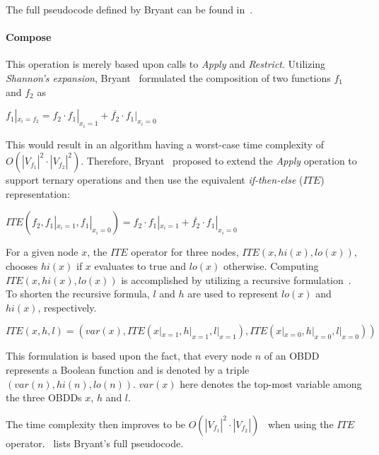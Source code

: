 \documentclass{vldb}
\begin{document}
The full pseudocode defined by Bryant can be found in~\cite[p. 685]{BRYANT86}.

\paragraph*{Compose}
\mbox{} %

This operation is merely based upon calls to \textit{Apply} and \textit{Restrict}.
Utilizing \textit{Shannon's expansion}, Bryant~\cite{BRYANT86} formulated the
composition of two functions $f_1$ and $f_2$ as
\begin{center}
$
f_1|_{x_i=f_2}=
f_2 \cdot f_1|_{x_i=1} + \overline{f_2} \cdot f_1|_{x_i=0}
$
\end{center}

This would result in an algorithm having a worst-case time complexity of 
$O\left(|V_{f_1}|^2 \cdot |V_{f_2}|^2\right)$. Therefore, Bryant~\cite{BRYANT86}
proposed to extend the \textit{Apply} operation to support ternary operations and
then use the equivalent \textit{if-then-else} ($ITE$) representation:
\begin{center}
$
ITE\left(f_2, f_1|_{x_i=1}, f_1|_{x_i=0}\right) =
f_2 \cdot f_1|_{x_i=1} + \overline{f_2} \cdot f_1|_{x_i=0}
$
\end{center}

\noindent
For a given node $x$, the $ITE$ operator for three nodes, \newline
$ITE(x, hi(x), lo(x))$, chooses $hi(x)$ if $x$ evaluates to true and $lo(x)$
otherwise. Computing $ITE(x, hi(x), lo(x))$ is accomplished by utilizing a
recursive formulation~\cite{BRACE90}. To shorten the recursive formula, $l$ and
$h$ are used to represent $lo(x)$ and $hi(x)$, respectively.
\begin{center}
$
ITE(x, h, l) =
(var(x), ITE(x|_{x=1}, h|_{x=1}, l|_{x=1}), ITE(x|_{x=0}, h|_{x=0}, l|_{x=0}))
$
\end{center}

This formulation is based upon the fact, that every node $n$ of an OBDD represents
a Boolean function and is denoted by a triple $(var(n), hi(n), lo(n))$. $var(x)$
here denotes the top-most variable among the three OBDDs $x$, $h$ and $l$.

The time complexity then improves to be
$O\left(|V_{f_1}|^2 \cdot |V_{f_2}|\right)$~\cite{BRYANT86} when using the $ITE$
operator.~\cite[p. 686]{BRYANT86} lists Bryant's full pseudocode.
\end{document}
